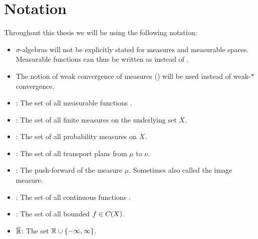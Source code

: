 \chapter*{Notation}

Throughout this thesis we will be using the following notation:

\begin{itemize}
	\item $\sigma$-algebras will not be explicitly stated for measures and measurable spaces. Measurable functions can thus be written as  instead of .
	\item The notion of weak convergence of measures () will be used instead of weak-* convergence.
	\item {}: The set of all measurable functions .
	\item {}: The set of all finite measures on the underlying set $X$.
	\item {}: The set of all probability measures on $X$.
	\item \TP{\mu}{\nu}: The set of all transport plans from $\mu$ to $\nu$.
	\item \push{\mu}: The push-forward of the measure $\mu$. Sometimes also called the image measure.
	\item {}: The set of all continuous functions .
	\item {}: The set of all bounded $f \in C_{}(X)$.
	\item $\overline{\mathbb{R}}$: The set $\mathbb{R} \cup \{ -\infty, \infty \}$.
\end{itemize}